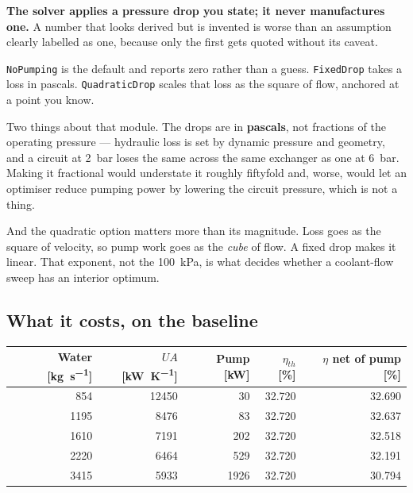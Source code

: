 \documentclass[11pt,a4paper]{report}
\newcommand{\code}[1]{\texttt{\small #1}}
\begin{document}
\begin{choicebox}
\textbf{The solver applies a pressure drop you state; it never manufactures
one.} A number that looks derived but is invented is worse than an
assumption clearly labelled as one, because only the first gets quoted
without its caveat.

\code{NoPumping} is the default and reports zero rather than a guess.
\code{FixedDrop} takes a loss in pascals. \code{QuadraticDrop} scales that
loss as the square of flow, anchored at a point you know.
\end{choicebox}


Two things about that module. The drops are in \textbf{pascals}, not
fractions of the operating pressure --- hydraulic loss is set by dynamic
pressure and geometry, and a circuit at \SI{2}{bar} loses the same across
the same exchanger as one at \SI{6}{bar}. Making it fractional would
understate it roughly fiftyfold and, worse, would let an optimiser reduce
pumping power by lowering the circuit pressure, which is not a thing.

And the quadratic option matters more than its magnitude. Loss goes as the
square of velocity, so pump work goes as the \emph{cube} of flow. A fixed
drop makes it linear. That exponent, not the \SI{100}{\kilo\pascal}, is what
decides whether a coolant-flow sweep has an interior optimum.

\subsection{What it costs, on the baseline}

\begin{center}
\begin{tabular}{@{}rrrrr@{}}
\toprule
Water [\si{\kilogram\per\second}] & $UA$ [\si{\kilo\watt\per\kelvin}]
  & Pump [\si{\kilo\watt}] & $\eta_{th}$ [\si{\percent}]
  & $\eta$ net of pump [\si{\percent}] \\
\midrule
 854 & 12450 &   30 & 32.720 & 32.690 \\
1195 &  8476 &   83 & 32.720 & 32.637 \\
1610 &  7191 &  202 & 32.720 & 32.518 \\
2220 &  6464 &  529 & 32.720 & 32.191 \\
3415 &  5933 & 1926 & 32.720 & 30.794 \\
\bottomrule
\end{tabular}
\end{center}
\end{document}
